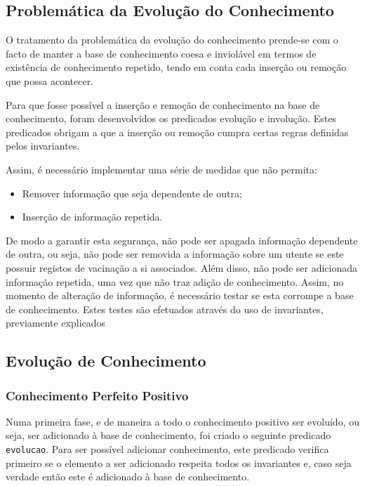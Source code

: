 \subsection{Problemática da Evolução do Conhecimento}

O tratamento da problemática da evolução do conhecimento prende-se com o facto de manter a base 
de conhecimento coesa e inviolável em termos
de existência de conhecimento repetido, tendo em conta cada inserção ou remoção que possa 
acontecer.

Para que fosse possível a inserção e remoção de conhecimento na base de conhecimento, foram 
desenvolvidos os predicados evolução e involução. Estes predicados obrigam a que a inserção 
ou remoção cumpra certas regras definidas pelos invariantes.

Assim, é necessário implementar uma série de medidas que não permita:

\begin{itemize}
    \item Remover informação que seja dependente de outra;
    \item Inserção de informação repetida.
\end{itemize}

De modo a garantir esta segurança, não pode ser apagada informação
dependente de outra, ou seja, não pode ser removida a informação sobre
um utente se este possuir registos de vacinação a si associados. Além disso, não pode
ser adicionada informação repetida, uma vez que não traz adição de conhecimento.
Assim, no momento de alteração de informação, é necessário testar se esta
corrompe a base de conhecimento. Estes testes são efetuados através do uso
de invariantes, previamente explicados

\subsection{Evolução de Conhecimento}

\subsubsection{Conhecimento Perfeito Positivo}

Numa primeira fase, e de maneira a todo o conhecimento positivo ser evoluído, ou
seja, ser adicionado à base de conhecimento, foi criado o seguinte predicado \texttt{evolucao}. 
Para ser possível adicionar conhecimento, este predicado verifica primeiro
se o elemento a ser adicionado respeita todos os invariantes e, caso seja verdade
então este é adicionado à base de conhecimento.

